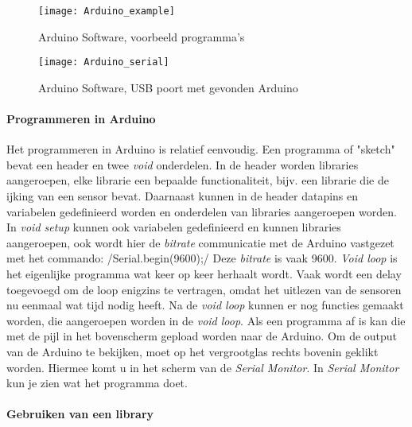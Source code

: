 \begin{figure}
    \centering
    \texttt{[image: Arduino\_example]}
    \caption{Arduino Software, voorbeeld programma's}
   \label{fig:Arduino_example}
\end{figure}

\begin{figure}
    \centering
    \texttt{[image: Arduino\_serial]}
    \caption{Arduino Software, USB poort met gevonden Arduino}
   \label{fig:Arduino_serial}
\end{figure}


\paragraph{Programmeren in Arduino}

Het programmeren in Arduino is relatief eenvoudig. Een programma of
"sketch" bevat een header en twee \emph{void} onderdelen. In de header
worden libraries aangeroepen, elke librarie een bepaalde
functionaliteit, bijv. een librarie die de ijking van een sensor bevat.
Daarnaast kunnen in de header datapins en variabelen gedefinieerd worden
en onderdelen van libraries aangeroepen worden. In \emph{void setup}
kunnen ook variabelen gedefinieerd en kunnen libraries aangeroepen, ook
wordt hier de \emph{bitrate} communicatie met de Arduino vastgezet met
het commando:  /Serial.begin(9600);/ Deze \emph{bitrate} is vaak 9600.
\emph{Void loop} is het eigenlijke programma wat keer op keer herhaalt
wordt. Vaak wordt een delay toegevoegd om de loop enigzins te vertragen,
omdat het uitlezen van de sensoren nu eenmaal wat tijd nodig heeft. Na
de \emph{void loop} kunnen er nog functies gemaakt worden, die
aangeroepen worden in de \emph{void loop}. Als een programma af is kan
die met de pijl in het bovenscherm gepload worden naar de Arduino.
Om de output van de Arduino te bekijken, moet op het vergrootglas rechts
bovenin geklikt worden. Hiermee komt u in het scherm van de \emph{Serial
Monitor}. In \emph{Serial Monitor} kun je zien wat het programma doet.


\paragraph{Gebruiken van een library}

